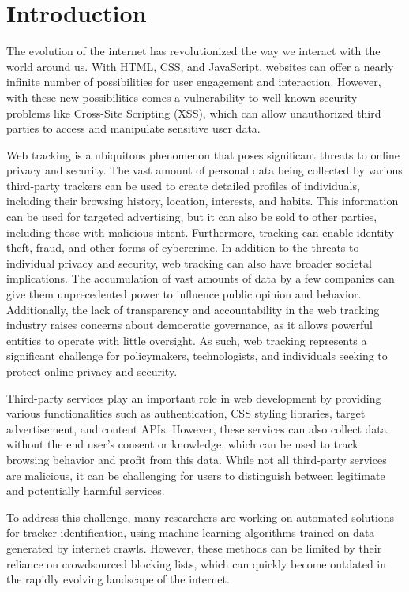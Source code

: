\chapter{Introduction}
\label{cha:introduction}

The evolution of the internet has revolutionized the way we interact with the world around us.
With HTML, CSS, and JavaScript, websites can offer a nearly infinite number of possibilities for user
engagement and interaction. However, with these new possibilities comes a vulnerability to well-known
security problems like Cross-Site Scripting (XSS), which can allow unauthorized third parties to access
and manipulate sensitive user data.

Web tracking is a ubiquitous phenomenon that poses significant threats to online privacy and security.
The vast amount of personal data being collected by various third-party trackers can be used to create
detailed profiles of individuals, including their browsing history, location, interests, and habits.
This information can be used for targeted advertising, but it can also be sold to other parties,
including those with malicious intent. Furthermore, tracking can enable identity theft,
fraud, and other forms of cybercrime. In addition to the threats to individual privacy and security,
web tracking can also have broader societal implications. The accumulation of vast amounts of data by a
few companies can give them unprecedented power to influence public opinion and behavior.
Additionally, the lack of transparency and accountability in the web tracking industry raises
concerns about democratic governance, as it allows powerful entities to operate with
little oversight. As such, web tracking represents a significant challenge for policymakers,
technologists, and individuals seeking to protect online privacy and security.

Third-party services play an important role in web development by providing various functionalities
such as authentication, CSS styling libraries, target advertisement, and content APIs. 
However, these services can also collect data without the end user's consent or knowledge,
which can be used to track browsing behavior and profit from this data. 
While not all third-party services are malicious, it can be challenging for users to distinguish between
legitimate and potentially harmful services.

To address this challenge, many researchers are working on automated solutions 
for tracker identification, using machine learning algorithms trained on data generated
by internet crawls. However, these methods can be limited by their reliance
on crowdsourced blocking lists, which can quickly become outdated in
the rapidly evolving landscape of the internet.

